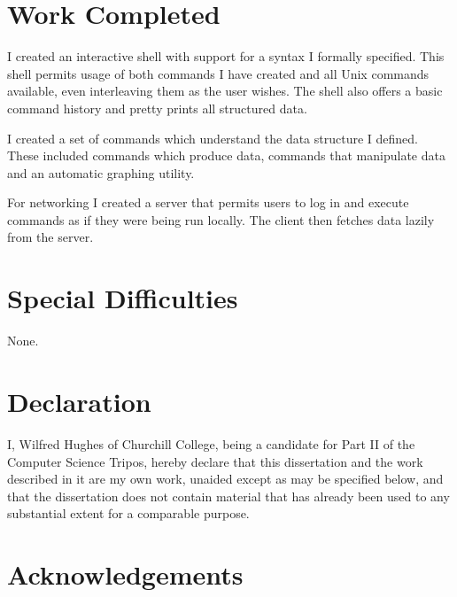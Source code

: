 \documentclass[12pt,twoside,notitlepage]{report}
\begin{document}
\section*{Work Completed}
I created an interactive shell with support for a syntax I formally
specified. This shell permits usage of both commands I have created and all Unix
commands available, even interleaving them as the user wishes. The shell also
offers a basic command history and pretty prints all structured data.

I created a set of commands which understand the data structure I defined. These
included commands which produce data, commands that manipulate data and an
automatic graphing utility.

For networking I created a server that permits users to log in and execute
commands as if they were being run locally. The client then fetches data lazily
from the server.

\section*{Special Difficulties}
None.
 
\newpage
\section*{Declaration}

I, Wilfred Hughes of Churchill College, being a candidate for Part II
of the Computer Science Tripos, hereby declare that this dissertation
and the work described in it are my own work, unaided except as may be
specified below, and that the dissertation does not contain material
that has already been used to any substantial extent for a comparable
purpose.

\bigskip
{}

\medskip
{}

\cleardoublepage

\tableofcontents

\listoffigures

\newpage
\section*{Acknowledgements}


\end{document}
